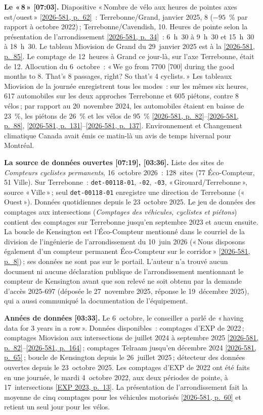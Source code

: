 \documentclass[11pt,letterpaper]{article}
\newcommand{\repourl}{https://github.com/OpenMobilityData/Terrebonne-open-sources}
\newcommand{\pagesurl}{https://openmobilitydata.github.io/Terrebonne-access-requests}
\newcommand{\cliptime}[1]{\textsf{\small[#1]}}
\newcommand{\pgl}[2]{\href{\pagesurl/2026-581/raw/01_emails_mandate_counts.pdf\#page=#1}{\textsf{\small[2026-581, p.~#2]}}}
\newcommand{\pg}[1]{\pgl{#1}{#1}}
\newcommand{\exppg}[1]{\href{\repourl/blob/main/2023-exp-mobility-study/raw/EXP_Etude_de_mobilite_rue_de_Terrebonne_2023.pdf}{\textsf{\small[EXP 2023, p.~#1]}}}
\begin{document}
\textbf{Le «\,8\,» \cliptime{07:03}.} Diapositive «\,Nombre de vélo aux
heures de pointes axes est/ouest\,» \pg{62}~: Terrebonne/Grand,
janvier 2025, 8 ($-95$~\% par rapport à octobre 2022)\,;
Terrebonne/Cavendish, 10. Heures de pointe selon la présentation de
l'arrondissement \pg{34}~: 6~h~30 à 9~h~30 et 15~h~30 à 18~h~30. Le tableau
Miovision de Grand du 29~janvier 2025 est à la \pg{85}. Le comptage de
12~heures à Grand ce jour-là, sur l'axe Terrebonne, était de 12.
Allocution du 6~octobre~: «\,We go from 7700 [700] during the good months to
8. That's 8 passages, right? So that's 4 cyclists.\,» Les tableaux Miovision
de la journée enregistrent tous les modes~: sur les mêmes six heures, 617
automobiles sur les deux approches Terrebonne et 605 piétons, contre 8
vélos\,; par rapport au 20~novembre 2024, les automobiles étaient en baisse
de 23~\%, les piétons de 26~\% et les vélos de 95~\% \pg{82}--\pg{88},
\pg{131}--\pg{137}. Environnement et Changement climatique Canada avait émis
ce matin-là un avis de temps hivernal pour Montréal.

\textbf{La source de données ouvertes \cliptime{07:19}, \cliptime{03:36}.}
Liste des sites de \emph{Compteurs cyclistes permanents}, 16~octobre 2026~:
128~sites (77 Éco-Compteur, 51 Ville). Sur Terrebonne~:
\texttt{det-00118-01}, \texttt{-02}, \texttt{-03}, «\,Girouard/Terrebonne\,»,
source «\,Ville\,»\,; seul \texttt{det-00118-01} enregistre une direction de
Terrebonne («\,Ouest\,»). Données quotidiennes depuis le 23~octobre 2025. Le
jeu de données des comptages aux intersections (\emph{Comptages des
véhicules, cyclistes et piétons}) contient des comptages sur Terrebonne
jusqu'en septembre 2023 et aucun ensuite. La boucle de Kensington est
l'Éco-Compteur mentionné dans le courriel de la division de l'ingénierie de
l'arrondissement du 10~juin 2026 («\,Nous disposons également d'un compteur
permanent Éco-Compteur sur le corridor\,» \pg{8})\,; ses données ne sont pas
sur le portail. L'auteur n'a trouvé aucun document ni aucune déclaration
publique de l'arrondissement mentionnant le compteur de Kensington avant
que son relevé ne soit obtenu par la demande d'accès 2025-697 (déposée le
27~novembre 2025, réponse le 19~décembre 2025), qui a aussi communiqué la
documentation de l'équipement.

\textbf{Années de données \cliptime{03:33}.} Le 6~octobre, le conseiller a
parlé de «\,having data for 3 years in a row\,». Données disponibles~:
comptages d'EXP de 2022\,; comptages Miovision aux intersections de
juillet 2024 à septembre 2025 \pg{82}--\pg{164}\,; comptages Telraam
jusqu'en décembre 2024 \pg{65}\,; boucle de Kensington depuis le
26~juillet 2025\,; détecteur des données ouvertes depuis le
23~octobre 2025. Les comptages d'EXP de 2022 ont été faits en une journée,
le mardi 4~octobre 2022, aux deux périodes de pointe, à 17~intersections
\exppg{13}. La présentation de l'arrondissement fait la moyenne de cinq
comptages pour les véhicules motorisés \pg{60} et retient un seul jour pour
les vélos.
\end{document}
